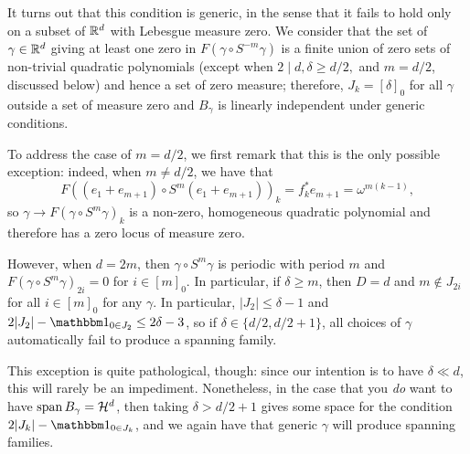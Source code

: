 \begin{remark}
  It turns out that this condition is generic, in the sense that it fails to hold only on a subset of $\mathbb{R}^d$ with Lebesgue measure zero.  We consider that the set of $\gamma \in \mathbb{R}^d$ giving at least one zero in $F(\gamma \circ S^{-m} \gamma)$ is a finite union of zero sets of non-trivial quadratic polynomials (except when $2 \mid d, \delta \ge d / 2,$ and $m = d / 2$, discussed below) and hence a set of zero measure; therefore, $J_k = [\delta]_0$ for all $\gamma$ outside a set of measure zero and $B_\gamma$ is linearly independent under generic conditions.

To address the case of $m = d/2$, we first remark that this is the only possible exception: indeed, when $m \neq d / 2$, we have that \[F((e_1 + e_{m + 1}) \circ S^m(e_1 + e_{m + 1}))_k = f_k^* e_{m + 1} = \omega^{m(k-1)},\] so $\gamma \to F(\gamma \circ S^m \gamma)_k$ is a non-zero, homogeneous quadratic polynomial and therefore has a zero locus of measure zero.

However, when $d = 2m$, then $\gamma \circ S^m \gamma$ is periodic with period $m$ and $F(\gamma \circ S^m \gamma)_{2i} = 0$ for $i \in [m]_0$.  In particular, if $\delta \ge m$, then $D = d$ and $m \notin J_{2i}$ for all $i \in [m]_0$ for any $\gamma$.  In particular, $|J_2| \le \delta - 1$ and $2 |J_2| - \one_{0 \in J_2} \le 2 \delta - 3 $, so if $\delta \in \{d / 2, d/2 + 1\}$,  all choices of $\gamma$ automatically fail to produce a spanning family.

This exception is quite pathological, though: since our intention is to have $\delta \ll d$, this will rarely be an impediment.  Nonetheless, in the case that you \emph{do} want to have $\operatorname{span} B_\gamma = \mathcal{H}^d$, then taking $\delta > d / 2 + 1$ gives some space for the condition $2|J_k| - \one_{0 \in J_k}$, and we again have that generic $\gamma$ will produce spanning families.
\end{remark}
